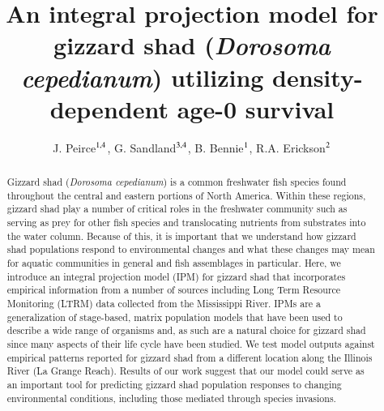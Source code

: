 \documentclass[preprint,review,12pt,authoryear]{elsarticle}
\begin{document}
\linenumbers
\begin{frontmatter}


\title{An integral projection model for gizzard shad (\emph{Dorosoma cepedianum}) utilizing density-dependent age-0 survival}

\author{ J. Peirce$^{\rm 1,4}$,  G.  Sandland$^{\rm 3,4}$, B. Bennie$^{\rm 1}$, R.A. Erickson$^{\rm 2}$}
\address{
${\rm 1}$ University of Wisconsin - La Crosse, Mathematics \& Statistics Department\\ 
${\rm 2}$ U.S.G.S. Upper Mississippi Environmental Science Center\\ 
${\rm 3}$ University of Wisconsin - La Crosse, Biology Department\\
${\rm 4}$ River Studies Center} 

\begin{abstract}
Gizzard shad (\emph{Dorosoma cepedianum}) is a common freshwater fish species found throughout the central and eastern portions of North America. 
Within these regions, gizzard shad play a number of critical roles in the freshwater community such as serving as prey for other fish species and translocating nutrients from substrates into the water column. 
Because of this, it is important that we understand how gizzard shad populations respond to environmental changes and what these changes may mean for aquatic communities in general and fish assemblages in particular. 
Here, we introduce an integral projection model (IPM) for gizzard shad that incorporates empirical information from a number of sources including Long Term Resource Monitoring (LTRM) data collected from the Mississippi River. 
IPMs are a generalization of stage-based, matrix population models that have been used to describe a wide range of organisms and, as such are a natural choice for gizzard shad since many aspects of their life cycle have been studied. 
We test model outputs against empirical patterns reported for gizzard shad from a different location along the Illinois River (La Grange Reach). 
Results of our work suggest that our model could serve as an important tool for predicting gizzard shad population responses to changing environmental conditions, including those mediated through species invasions.
\end{abstract}

\begin{graphicalabstract}
\begin{figure}
    \begin{center}
\begin{tikzpicture}[->,>=stealth',shorten >=1pt,auto,node distance=3cm,
  thick,
  main node/.style={rectangle,draw},
  box/.style = {draw=gray, very thick,
                            minimum height=11mm, text width=11mm, 
                            align=center},]
                              

\end{tikzpicture}
\end{center}
\end{figure}
\end{graphicalabstract}
\end{frontmatter}
\end{document}
